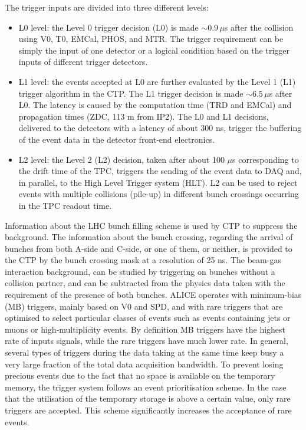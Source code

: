 The trigger inputs are divided into three different levels:
\begin{itemize}
\item L0 level: the Level 0 trigger decision (L0) is made $\sim 0.9\, \mu$s after the 
collision using V0, T0, EMCal, PHOS, and MTR. The trigger requirement can be 
simply the input of one detector or a logical condition based on the trigger 
inputs of different trigger detectors.
\item L1 level: the events accepted at L0 are further evaluated by the Level 1 (L1) 
trigger algorithm in the CTP. The L1 trigger decision is made $\sim 6.5\, \mu$s after L0. 
The latency is caused by the computation time (TRD and EMCal) and propagation times 
(ZDC, 113 m from IP2). The L0 and L1 decisions, delivered to the detectors with a 
latency of about 300 ns, trigger the buffering of the event data in the detector front-end electronics. 
\item L2 level: the Level 2 (L2) decision, taken after about 100 $\mu$s corresponding to the 
drift time of the TPC, triggers the sending of the event data to DAQ and, in parallel, to the High Level Trigger system (HLT). 
L2 can be used to reject events with multiple collisions (pile-up) in different bunch crossings occurring
in the TPC readout time.
\end{itemize}
Information about the LHC bunch filling scheme is used by CTP to suppress the background. 
The information about the bunch crossing, regarding the arrival of bunches from both A-side and C-side,
or one of them, or neither, is provided to the CTP by the bunch crossing mask at a resolution of 25 ns. 
The beam-gas interaction background, can be studied by triggering on bunches without a collision partner, and can be 
subtracted from the physics data taken with the requirement of the presence of both bunches.
ALICE operates with minimum-bias (MB) triggers, mainly based on V0 and SPD, 
and with rare triggers that are optimised to select particular classes of events such as 
events containing jets or muons or high-multiplicity events. By definition MB triggers 
have the highest rate of inputs signals, while the rare triggers have much lower rate. 
In general, several types of triggers during the data taking at the same time keep busy a 
very large fraction of the total data acquisition bandwidth. To prevent losing precious events due to the fact that no 
space is available on the temporary memory, the trigger system follows an event prioritisation scheme. 
In the case that the utilisation of the temporary storage is above a certain 
value, only rare triggers are accepted. This scheme significantly increases the acceptance of rare events.

